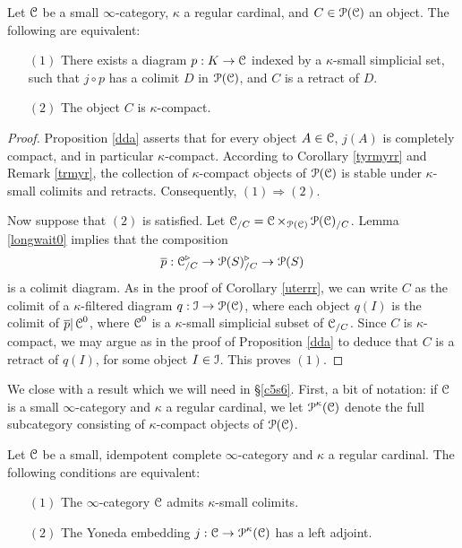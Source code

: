 \begin{proposition}\label{charsmallpre}
Let $\operatorname{\mathcal{C}}$ be a small $\infty$-category, $\kappa$ a regular cardinal, and 
$C \in \operatorname{\mathcal{P}}(\operatorname{\mathcal{C}})$ an object. The following are equivalent:
\begin{itemize}
\item[$(1)$] There exists a diagram $p: K \rightarrow \operatorname{\mathcal{C}}$ indexed by a $\kappa$-small
simplicial set, such that $j \circ p$ has a colimit $D$ in $\operatorname{\mathcal{P}}(\operatorname{\mathcal{C}})$, and $C$ is a retract of $D$.
\item[$(2)$] The object $C$ is $\kappa$-compact.
\end{itemize}
\end{proposition}

\begin{proof}
Proposition \ref{dda} asserts that for every object $A \in \operatorname{\mathcal{C}}$, $j(A)$ is completely compact, and in particular $\kappa$-compact. According to Corollary \ref{tyrmyrr} and Remark \ref{trmyr}, the collection of $\kappa$-compact objects of $\operatorname{\mathcal{P}}(\operatorname{\mathcal{C}})$ is stable under $\kappa$-small colimits and retracts. Consequently, $(1) \Rightarrow (2)$.

Now suppose that $(2)$ is satisfied. Let $\operatorname{\mathcal{C}}_{/C} = \operatorname{\mathcal{C}} \times_{\operatorname{\mathcal{P}}(\operatorname{\mathcal{C}})} \operatorname{\mathcal{P}}(\operatorname{\mathcal{C}})_{/C}$.
Lemma \ref{longwait0} implies that the composition
$$ \overline{p}: \operatorname{\mathcal{C}}_{/C}^{\triangleright} \rightarrow \operatorname{\mathcal{P}}(S)_{/C}^{\triangleright} \rightarrow \operatorname{\mathcal{P}}(S)$$ is a colimit diagram. As in the proof of Corollary \ref{uterrr}, we can write $C$ as the colimit
of a $\kappa$-filtered diagram $q: \operatorname{\mathcal{I}} \rightarrow \operatorname{\mathcal{P}}(\operatorname{\mathcal{C}})$, where each object
$q(I)$ is the colimit of $\overline{p} | \operatorname{\mathcal{C}}^{0}$, where $\operatorname{\mathcal{C}}^{0}$ is a $\kappa$-small
simplicial subset of $\operatorname{\mathcal{C}}_{/C}$. Since $C$ is $\kappa$-compact, we may argue as in the proof of Proposition \ref{dda} to deduce that $C$ is a retract of $q(I)$, for some object $I \in \operatorname{\mathcal{I}}$.
This proves $(1)$.
\end{proof}

We close with a result which we will need in \S \ref{c5s6}. First, a bit of notation: if $\operatorname{\mathcal{C}}$ is a small $\infty$-category and $\kappa$ a regular cardinal, we let $\operatorname{\mathcal{P}}^{\kappa}(\operatorname{\mathcal{C}})$ denote the full subcategory consisting of $\kappa$-compact objects of $\operatorname{\mathcal{P}}(\operatorname{\mathcal{C}})$.

\begin{proposition}\label{kcolim}
Let $\operatorname{\mathcal{C}}$ be a small, idempotent complete $\infty$-category and $\kappa$ a regular cardinal. The following conditions are equivalent:
\begin{itemize}
\item[$(1)$] The $\infty$-category $\operatorname{\mathcal{C}}$ admits $\kappa$-small colimits.
\item[$(2)$] The Yoneda embedding $j: \operatorname{\mathcal{C}} \rightarrow \operatorname{\mathcal{P}}^{\kappa}(\operatorname{\mathcal{C}})$ has a left adjoint.
\end{itemize}
\end{proposition}

